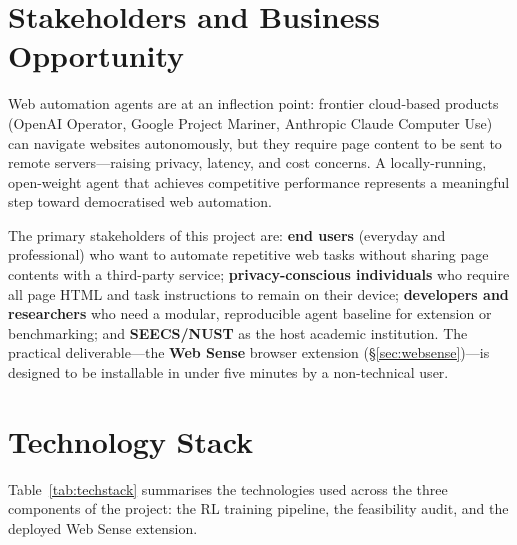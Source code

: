 \documentclass[12pt,a4paper]{report}
\begin{document}
\section{Stakeholders and Business Opportunity}

Web automation agents are at an inflection point: frontier cloud-based products (OpenAI Operator, Google Project Mariner, Anthropic Claude Computer Use) can navigate websites autonomously, but they require page content to be sent to remote servers---raising privacy, latency, and cost concerns. A locally-running, open-weight agent that achieves competitive performance represents a meaningful step toward democratised web automation.

The primary stakeholders of this project are: \textbf{end users} (everyday and professional) who want to automate repetitive web tasks without sharing page contents with a third-party service; \textbf{privacy-conscious individuals} who require all page HTML and task instructions to remain on their device; \textbf{developers and researchers} who need a modular, reproducible agent baseline for extension or benchmarking; and \textbf{SEECS/NUST} as the host academic institution. The practical deliverable---the \textbf{Web Sense} browser extension (\S\ref{sec:websense})---is designed to be installable in under five minutes by a non-technical user.

\section{Technology Stack}

Table~\ref{tab:techstack} summarises the technologies used across the three components of the project: the RL training pipeline, the feasibility audit, and the deployed Web Sense extension.
\end{document}
